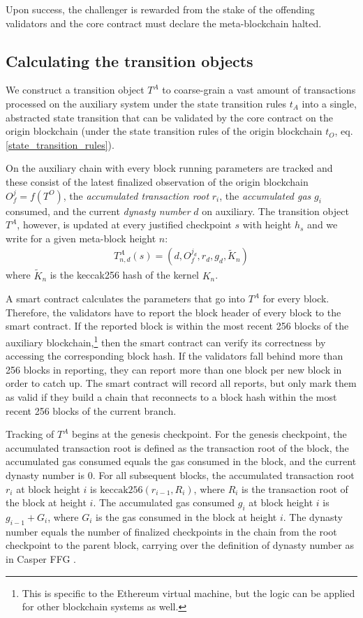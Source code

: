 \documentclass[12pt,a4paper]{article}
\begin{document}
Upon success, the challenger is rewarded from the stake of the offending validators and the core contract must declare the meta-blockchain halted.

\subsection{Calculating the transition objects}

We construct a transition object $T^A$ to coarse-grain a vast amount of transactions processed on the auxiliary system under the state transition rules $t_A$ into a single, abstracted state transition that can be validated by the core contract on the origin blockchain (under the state transition rules of the origin blockchain $t_O$, eq. \ref{state_transition_rules}).

On the auxiliary chain with every block running parameters are tracked and these consist of the latest finalized observation of the origin blockchain $O^j_f= f(T^O)$, the \emph{accumulated transaction root} $r_i$, the \emph{accumulated gas} $g_i$ consumed, and the current \emph{dynasty number} $d$ on auxiliary.
The transition object $T^A$, however, is updated at every justified checkpoint $s$ with height $h_s$ and we write for a given meta-block height $n$:
\begin{align*}
  T^A_{n,d}(s) = (d, O^{j_d}_f, r_d, g_d, \tilde{K}_n)
\end{align*}
where $\tilde{K}_n$ is the keccak256 hash of the kernel $K_n$.

A smart contract calculates the parameters that go into $T^A$ for every block.
Therefore, the validators have to report the block header of every block to the smart contract.
If the reported block is within the most recent 256 blocks of the auxiliary blockchain,\footnote{
	This is specific to the Ethereum virtual machine, but the logic can be applied for other blockchain systems as well.
}
then the smart contract can verify its correctness by accessing the corresponding block hash.
If the validators fall behind more than 256 blocks in reporting, they can report more than one block per new block in order to catch up.
The smart contract will record all reports, but only mark them as valid if they build a chain that reconnects to a block hash within the most recent 256 blocks of the current branch.

Tracking of $T^A$ begins at the genesis checkpoint.
For the genesis checkpoint, the accumulated transaction root is defined as the transaction root of the block, the accumulated gas consumed equals the gas consumed in the block, and the current dynasty number is 0.
For all subsequent blocks, the accumulated transaction root $r_i$ at block height $i$ is $\text{keccak256}(r_{i-1}, R_i)$, where $R_i$ is the transaction root of the block at height $i$.
The accumulated gas consumed $g_i$ at block height $i$ is $g_{i-1} + G_i$, where $G_i$ is the gas consumed in the block at height $i$.
The dynasty number equals the number of finalized checkpoints in the chain from the root checkpoint to the parent block, carrying over the definition of dynasty number as in Casper FFG \cite{casperffg}.
\end{document}
